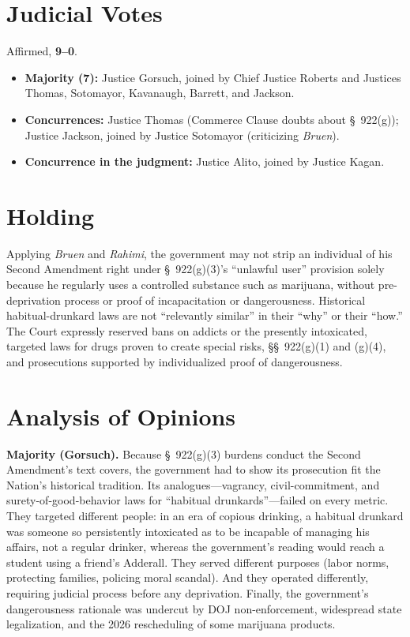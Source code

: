 \documentclass[12pt]{article}
\begin{document}
\section{Judicial Votes}

Affirmed, \textbf{9--0}.
\begin{itemize}
\item \textbf{Majority (7):} Justice Gorsuch, joined by Chief Justice Roberts and Justices Thomas, Sotomayor, Kavanaugh, Barrett, and Jackson.
\item \textbf{Concurrences:} Justice Thomas (Commerce Clause doubts about \S~922(g)); Justice Jackson, joined by Justice Sotomayor (criticizing \textit{Bruen}).
\item \textbf{Concurrence in the judgment:} Justice Alito, joined by Justice Kagan.
\end{itemize}

\section{Holding}

Applying \textit{Bruen} and \textit{Rahimi}, the government may not strip an individual of his Second Amendment right under \S~922(g)(3)'s ``unlawful user'' provision solely because he regularly uses a controlled substance such as marijuana, without pre-deprivation process or proof of incapacitation or dangerousness. Historical habitual-drunkard laws are not ``relevantly similar'' in their ``why'' or their ``how.'' The Court expressly reserved bans on addicts or the presently intoxicated, targeted laws for drugs proven to create special risks, \S\S~922(g)(1) and (g)(4), and prosecutions supported by individualized proof of dangerousness.

\section{Analysis of Opinions}

\textbf{Majority (Gorsuch).} Because \S~922(g)(3) burdens conduct the Second Amendment's text covers, the government had to show its prosecution fit the Nation's historical tradition. Its analogues---vagrancy, civil-commitment, and surety-of-good-behavior laws for ``habitual drunkards''---failed on every metric. They targeted different people: in an era of copious drinking, a habitual drunkard was someone so persistently intoxicated as to be incapable of managing his affairs, not a regular drinker, whereas the government's reading would reach a student using a friend's Adderall. They served different purposes (labor norms, protecting families, policing moral scandal). And they operated differently, requiring judicial process before any deprivation. Finally, the government's dangerousness rationale was undercut by DOJ non-enforcement, widespread state legalization, and the 2026 rescheduling of some marijuana products.
\end{document}
